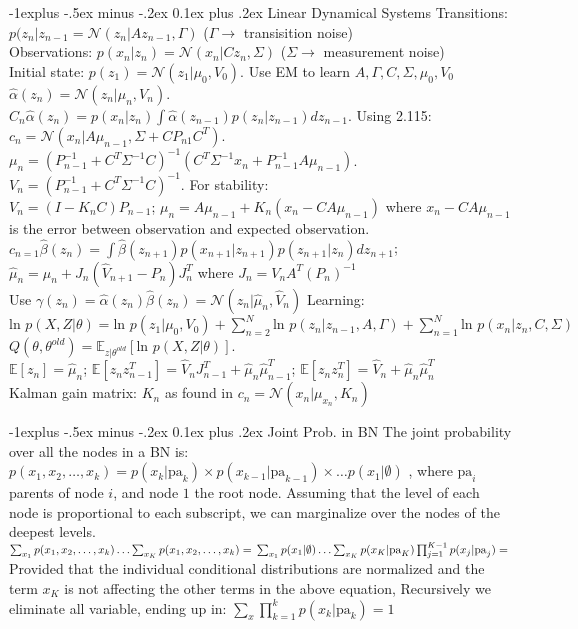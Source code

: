 \documentclass[9pt,landscape]{article}
\makeatletter
\renewcommand{\subsection}{\@startsection{subsection}{2}{0mm}%
                                {-1explus -.5ex minus -.2ex}%
                                {0.1ex plus .2ex}%
                                {\normalfont\scriptsize\bfseries}}
\makeatother
\begin{document}
\begin{multicols}{3}
\subsection{Linear Dynamical Systems}
Transitions: $p(z_n|z_{n-1} = \mathcal{N}(z_n|Az_{n-1}, \Gamma)$ ($\Gamma \rightarrow$ transisition noise)\\
Observations: $p(x_n|z_n) = \mathcal{N}(x_n|Cz_n, \Sigma)$ ($\Sigma \rightarrow$ measurement noise)\\
Initial state: $p(z_1) = \mathcal{N}(z_1|\mu_0, V_0)$. Use EM to learn $A, \Gamma, C, \Sigma, \mu_0, V_0$ \\
$\hat\alpha(z_n) = \mathcal{N}(z_n|\mu_n, V_n)$. \\
$C_n\hat\alpha(z_n) = p(x_n|z_n)\int\hat\alpha(z_{n-1})p(z_n|z_{n-1})dz_{n-1}$. Using 2.115: $c_n = \mathcal{N}(x_n|A\mu_{n-1},\Sigma+CP_{n1}C^T)$. $\mu_n = (P_{n-1}^{-1} + C^T\Sigma^{-1}C)^{-1} (C^T\Sigma^{-1}x_n + P_{n-1}^{-1}A\mu_{n-1})$. $V_n = (P_{n-1}^{-1} + C^T\Sigma^{-1}C)^{-1}$. For stability:\\
$V_n = (I-K_nC)P_{n-1}$; $\mu_n = A\mu_{n-1} + K_n(x_n - CA\mu_{n-1})$ where $x_n-CA\mu_{n-1}$ is the error between observation and expected observation.\\
$c_{n=1}\hat\beta(z_n) = \int \hat\beta(z_{n+1})p(x_{n+1}|z_{n+1}) p(z_{n+1}|z_n) dz_{n+1}$; $\hat\mu_n = \mu_n + J_n(\hat V_{n+1} - P_n)J_n^T$ where $J_n = V_nA^T(P_n)^{-1}$\\
Use $\gamma(z_n) = \hat\alpha(z_n)\hat\beta(z_n) = \mathcal{N}(z_n|\hat\mu_n, \hat V_n)$
Learning: $\text{ln } p(X,Z|\theta) = \text{ln } p(z_1|\mu_0, V_0) + \sum^N_{n=2} \text{ln } p(z_n|z_{n-1}, A, \Gamma) + \sum^N_{n=1} \text{ln } p(x_n|z_n, C, \Sigma)$ \\
$Q(\theta, \theta^{old}) = \mathbb{E}_{z|\theta^{old}}[\text{ln } p(X,Z|\theta)]$.\\
$\mathbb{E}[z_n] = \hat\mu_n$; $\mathbb{E}[z_nz_{n-1}^T] = \hat V_nJ_{n-1}^T+\hat\mu_n\hat\mu_{n-1}^T$; $\mathbb{E}[z_nz_n^T]= \hat V_n + \hat\mu_n\hat\mu_n^T$\\
Kalman gain matrix: $K_n$ as found in $c_n = \mathcal{N}(x_n|\mu_{x_n}, K_n)$

\subsection{Joint Prob. in BN}
The joint probability over all the nodes in a BN is:
$
p(x_1,x_2,\ldots,x_k) = p(x_k|\mathrm{pa}_k) \times p(x_{k-1}|\mathrm{pa}_{k-1})\times \ldots p(x_1|\emptyset)
$
, where $\mathrm{pa}_i$ parents of node $i$, and node $1$ the root node. Assuming that the level of each node is proportional to each subscript, we can marginalize over the nodes of the deepest levels.
$
\sum_{x_1}p(x_1,x_2,\ldots,x_k) \ldots \sum_{x_K}p(x_1,x_2,\ldots,x_k) =\\
\sum_{x_1}p(x_1| \emptyset ) \ldots \sum_{x_K}p(x_K|\mathrm{pa}_K) \prod_{j=1}^{K-1}p(x_j|\mathrm{pa}_j) =\\
$
Provided that the individual conditional distributions are normalized and the term $x_K$ is not affecting the other terms in the above equation, Recursively we eliminate all variable, ending up in: $\sum_x\prod_{k=1}^kp(x_k|\mathrm{pa}_k) =1$
\vspace{.5em}

\end{multicols}
\end{document}
